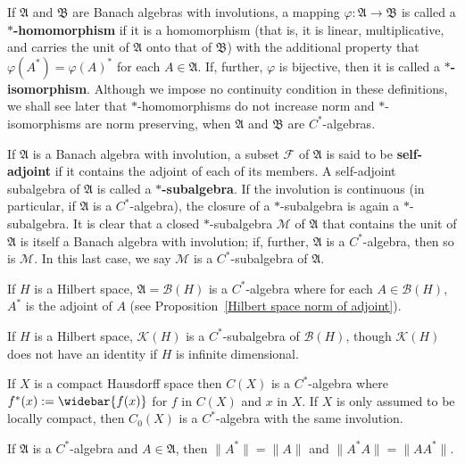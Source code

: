 If $\mathfrak{A}$ and $\mathfrak{B}$ are Banach algebras with involutions, a mapping $\varphi:\mathfrak{A}\to\mathfrak{B}$ is called a \textbf{$*$-homomorphism} if it is a homomorphism (that is, it is linear, multiplicative, and carries the unit of $\mathfrak{A}$ onto that of $\mathfrak{B}$) with the additional property that $\varphi(A^*)=\varphi(A)^*$ for each $A\in\mathfrak{A}$. If, further, $\varphi$ is bijective, then it is called a \textbf{$*$-isomorphism}. Although we impose no continuity condition in these definitions, we shall see later that $*$-homomorphisms do not increase norm and $*$-isomorphisms are norm preserving, when $\mathfrak{A}$ and $\mathfrak{B}$ are $C^*$-algebras.\par
If $\mathfrak{A}$ is a Banach algebra with involution, a subset $\mathscr{F}$ of $\mathfrak{A}$ is said to be \textbf{self-adjoint} if it contains the adjoint of each of its members. A self-adjoint subalgebra of $\mathfrak{A}$ is called a \textbf{$*$-subalgebra}. If the involution is continuous (in particular, if $\mathfrak{A}$ is a $C^*$-algebra), the closure of a $*$-subalgebra is again a $*$-subalgebra. It is clear that a closed $*$-subalgebra $\mathscr{M}$ of $\mathfrak{A}$ that contains the unit of $\mathfrak{A}$ is itself a Banach algebra with involution; if, further, $\mathfrak{A}$ is a $C^*$-algebra, then so is $\mathscr{M}$. In this last case, we say $\mathscr{M}$ is a $C^*$-subalgebra of $\mathfrak{A}$.
\begin{example}
If $H$ is a Hilbert space, $\mathfrak{A}=\mathcal{B}(H)$ is a $C^*$-algebra where for each $A\in\mathcal{B}(H)$, $A^*$ is the adjoint of $A$ (see Proposition~\ref{Hilbert space norm of adjoint}).
\end{example}
\begin{example}
If $H$ is a Hilbert space, $\mathcal{K}(H)$ is a $C^*$-subalgebra of $\mathcal{B}(H)$, though $\mathcal{K}(H)$ does not have an identity if $H$ is infinite dimensional.
\end{example}
\begin{example}
If $X$ is a compact Hausdorff space then $C(X)$ is a $C^*$-algebra where $f^*(x):=\widebar{f(x)}$ for $f$ in $C(X)$ and $x$ in $X$. If $X$ is only assumed to be locally compact, then $C_0(X)$ is a $C^*$-algebra with the same involution.
\end{example}
\begin{proposition}\label{C^* algebra norm of adjoint}
If $\mathfrak{A}$ is a $C^*$-algebra and $A\in\mathfrak{A}$, then $\|A^*\|=\|A\|$ and $\|A^*A\|=\|AA^*\|$.
\end{proposition}

